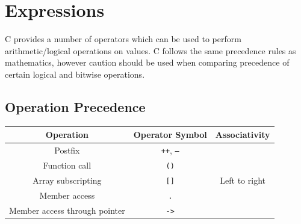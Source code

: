 \documentclass{report}
\begin{document}
\chapter{Expressions}
C provides a number of operators which can be used to perform arithmetic/logical operations on values.
C follows the same precedence rules as mathematics, however caution should be used when
comparing precedence of certain logical and bitwise operations.
\section{Operation Precedence}
\begin{table}[H]
    \centering
    \begin{tabular}{c c c}
        \toprule
        \textbf{Operation}            & \textbf{Operator Symbol}                                                                                                                                                                                                  & \textbf{Associativity}         \\
        \midrule
        Postfix                       & \texttt{++}, \texttt{--}                                                                                                                                                                                    & \multirow{5}{*}{Left to right} \\
        Function call                 & \texttt{()}                                                                                                                                                                                                        &                                \\
        Array subscripting            & \texttt{[]}                                                                                                                                                                                                        &                                \\
        Member access                 & \texttt{.}                                                                                                                                                                                                         &                                \\
        Member access through pointer & \texttt{->}                                                                                                                                                                                                        &                                \\

\end{tabular}
\end{table}
\end{document}
